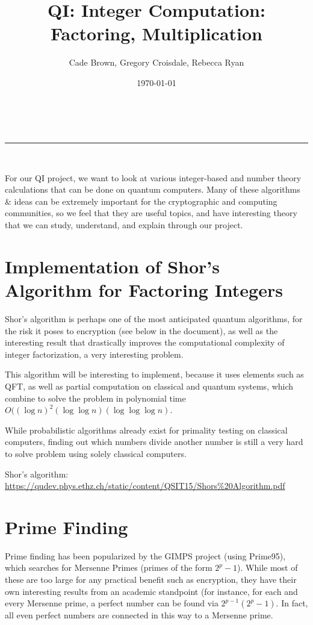 \documentclass[a4paper,11pt]{article}
\makeatletter
\newcommand{\linia}{\rule{\linewidth}{0.5pt}}
\theoremstyle{mytheor}
\renewcommand{\maketitle}{
\begin{center}
\vspace{2ex}
{\huge \textsc{\@title}}
\vspace{1ex}
\\
\linia\\
\@author \hfill \@date
\vspace{4ex}
\end{center}
}
\makeatother
\begin{document}
\title{QI: Integer Computation: Factoring, Multiplication}

\author{Cade Brown, Gregory Croisdale, Rebecca Ryan}

\date{\today}

\maketitle


For our QI project, we want to look at various integer-based and number theory calculations that can be done on quantum computers. Many of these algorithms \& ideas can be extremely important for the cryptographic and computing communities, so we feel that they are useful topics, and have interesting theory that we can study, understand, and explain through our project.

\section*{Implementation of Shor's Algorithm for Factoring Integers}

Shor's algorithm is perhaps one of the most anticipated quantum algorithms, for the risk it poses to encryption (see below in the document), as well as the interesting result that drastically improves the computational complexity of integer factorization, a very interesting problem.

This algorithm will be interesting to implement, because it uses elements such as QFT, as well as partial computation on classical and quantum systems, which combine to solve the problem in polynomial time $O((\log n)^2(\log \log n)(\log \log \log n)$.

While probabilistic algorithms already exist for primality testing on classical computers, finding out which numbers divide another number is still a very hard to solve problem using solely classical computers.

Shor's algorithm: \href{https://qudev.phys.ethz.ch/static/content/QSIT15/Shors\%20Algorithm.pdf}{https://qudev.phys.ethz.ch/static/content/QSIT15/Shors\%20Algorithm.pdf}


\section*{Prime Finding}

Prime finding has been popularized by the GIMPS project (using Prime95), which searches for Mersenne Primes (primes of the form $2^p-1$). While most of these are too large for any practical benefit such as encryption, they have their own interesting results from an academic standpoint (for instance, for each and every Mersenne prime, a perfect number can be found via $2^{p-1}(2^p-1)$. In fact, all even perfect numbers are connected in this way to a Mersenne prime.
\end{document}
